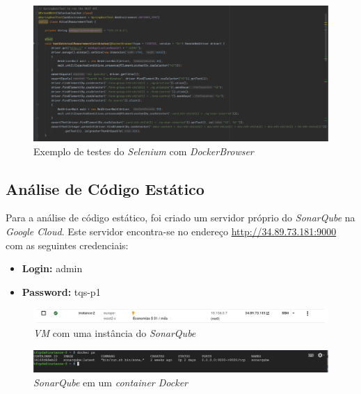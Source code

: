 \documentclass[10pt,english]{article}
\begin{document}
\begin{figure}[h]
    \centering
    \includegraphics[width=450]{images/selenium-test.png}
    \caption{Exemplo de testes do \textit{Selenium} com \textit{DockerBrowser}}
\end{figure}

\clearpage

\subsection{Análise de Código Estático}

\par Para a análise de código estático, foi criado um servidor próprio do \textit{SonarQube} na \textit{Google Cloud}. Este servidor encontra-se no endereço \href{http://34.89.73.181:9000}{http://34.89.73.181:9000} com as seguintes credenciais:

\begin{itemize}
    \item \textbf{Login:} admin
    \item \textbf{Password:} tqs-p1
\end{itemize}

\begin{figure}[h]
    \centering
    \includegraphics[width=450]{images/instancia-sonar-google.png}
    \caption{\textit{VM} com uma instância do \textit{SonarQube}}
\end{figure}

\begin{figure}[h]
    \centering
    \includegraphics[width=450]{images/docker-ps-sonar.png}
    \caption{\textit{SonarQube} em um \textit{container Docker}}
\end{figure}
\end{document}

